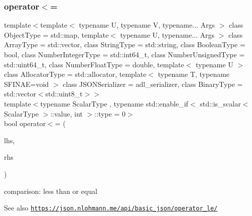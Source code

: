 \subsubsection{\texorpdfstring{operator$<$=}{operator<=}\hspace{0.1cm}{\footnotesize\ttfamily [3/3]}}
{\footnotesize\ttfamily template$<$template$<$ typename U, typename V, typename... Args $>$ class Object\+Type = std\+::map, template$<$ typename U, typename... Args $>$ class Array\+Type = std\+::vector, class String\+Type  = std\+::string, class Boolean\+Type  = bool, class Number\+Integer\+Type  = std\+::int64\+\_\+t, class Number\+Unsigned\+Type  = std\+::uint64\+\_\+t, class Number\+Float\+Type  = double, template$<$ typename U $>$ class Allocator\+Type = std\+::allocator, template$<$ typename T, typename S\+F\+I\+N\+A\+E=void $>$ class J\+S\+O\+N\+Serializer = adl\+\_\+serializer, class Binary\+Type  = std\+::vector$<$std\+::uint8\+\_\+t$>$$>$ \\
template$<$typename Scalar\+Type , typename std\+::enable\+\_\+if$<$ std\+::is\+\_\+scalar$<$ Scalar\+Type $>$\+::value, int $>$\+::type  = 0$>$ \\
bool operator$<$= (\begin{DoxyParamCaption}\item[{Scalar\+Type}]{lhs,  }\item[{\hyperlink{classnlohmann_1_1basic__json_ab8a1c33ee7b154fc41ca2545aa9724e6}{const\+\_\+reference}}]{rhs }\end{DoxyParamCaption})\hspace{0.3cm}{\ttfamily [friend]}}



comparison\+: less than or equal 

\begin{DoxySeeAlso}{See also}
\href{https://json.nlohmann.me/api/basic_json/operator_le/}{\tt https\+://json.\+nlohmann.\+me/api/basic\+\_\+json/operator\+\_\+le/} 
\end{DoxySeeAlso}
\mbox{\label{classnlohmann_1_1basic__json_a122640e7e2db1814fc7bbb3c122ec76e}} 

